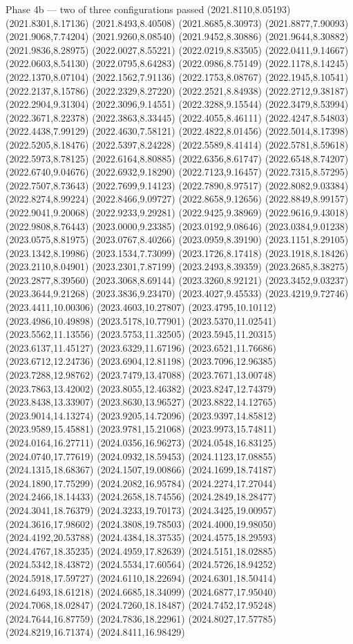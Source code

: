 \documentclass[aspectratio=169,10pt]{beamer}
\begin{document}
\begin{frame}[t]{Phase 4b — two of three configurations passed}
(2021.8110,8.05193) (2021.8301,8.17136) (2021.8493,8.40508) (2021.8685,8.30973) (2021.8877,7.90093) (2021.9068,7.74204) (2021.9260,8.08540) (2021.9452,8.30886) (2021.9644,8.30882) (2021.9836,8.28975) (2022.0027,8.55221) (2022.0219,8.83505) (2022.0411,9.14667) (2022.0603,8.54130) (2022.0795,8.64283) (2022.0986,8.75149) (2022.1178,8.14245) (2022.1370,8.07104) (2022.1562,7.91136) (2022.1753,8.08767) (2022.1945,8.10541) (2022.2137,8.15786) (2022.2329,8.27220) (2022.2521,8.84938) (2022.2712,9.38187) (2022.2904,9.31304) (2022.3096,9.14551) (2022.3288,9.15544) (2022.3479,8.53994) (2022.3671,8.22378) (2022.3863,8.33445) (2022.4055,8.46111) (2022.4247,8.54803) (2022.4438,7.99129) (2022.4630,7.58121) (2022.4822,8.01456) (2022.5014,8.17398) (2022.5205,8.18476) (2022.5397,8.24228) (2022.5589,8.41414) (2022.5781,8.59618) (2022.5973,8.78125) (2022.6164,8.80885) (2022.6356,8.61747) (2022.6548,8.74207) (2022.6740,9.04676) (2022.6932,9.18290) (2022.7123,9.16457) (2022.7315,8.57295) (2022.7507,8.73643) (2022.7699,9.14123) (2022.7890,8.97517) (2022.8082,9.03384) (2022.8274,8.99224) (2022.8466,9.09727) (2022.8658,9.12656) (2022.8849,8.99157) (2022.9041,9.20068) (2022.9233,9.29281) (2022.9425,9.38969) (2022.9616,9.43018) (2022.9808,8.76443) (2023.0000,9.23385) (2023.0192,9.08646) (2023.0384,9.01238) (2023.0575,8.81975) (2023.0767,8.40266) (2023.0959,8.39190) (2023.1151,8.29105) (2023.1342,8.19986) (2023.1534,7.73099) (2023.1726,8.17418) (2023.1918,8.18426) (2023.2110,8.04901) (2023.2301,7.87199) (2023.2493,8.39359) (2023.2685,8.38275) (2023.2877,8.39560) (2023.3068,8.69144) (2023.3260,8.92121) (2023.3452,9.03237) (2023.3644,9.21268) (2023.3836,9.23470) (2023.4027,9.45533) (2023.4219,9.72746) (2023.4411,10.00306) (2023.4603,10.27807) (2023.4795,10.10112) (2023.4986,10.49898) (2023.5178,10.77901) (2023.5370,11.02541) (2023.5562,11.13556) (2023.5753,11.32505) (2023.5945,11.20315) (2023.6137,11.45127) (2023.6329,11.67196) (2023.6521,11.76686) (2023.6712,12.24736) (2023.6904,12.81198) (2023.7096,12.96385) (2023.7288,12.98762) (2023.7479,13.47088) (2023.7671,13.00748) (2023.7863,13.42002) (2023.8055,12.46382) (2023.8247,12.74379) (2023.8438,13.33907) (2023.8630,13.96527) (2023.8822,14.12765) (2023.9014,14.13274) (2023.9205,14.72096) (2023.9397,14.85812) (2023.9589,15.45881) (2023.9781,15.21068) (2023.9973,15.74811) (2024.0164,16.27711) (2024.0356,16.96273) (2024.0548,16.83125) (2024.0740,17.77619) (2024.0932,18.59453) (2024.1123,17.08855) (2024.1315,18.68367) (2024.1507,19.00866) (2024.1699,18.74187) (2024.1890,17.75299) (2024.2082,16.95784) (2024.2274,17.27044) (2024.2466,18.14433) (2024.2658,18.74556) (2024.2849,18.28477) (2024.3041,18.76379) (2024.3233,19.70173) (2024.3425,19.00957) (2024.3616,17.98602) (2024.3808,19.78503) (2024.4000,19.98050) (2024.4192,20.53788) (2024.4384,18.37535) (2024.4575,18.29593) (2024.4767,18.35235) (2024.4959,17.82639) (2024.5151,18.02885) (2024.5342,18.43872) (2024.5534,17.60564) (2024.5726,18.94252) (2024.5918,17.59727) (2024.6110,18.22694) (2024.6301,18.50414) (2024.6493,18.61218) (2024.6685,18.34099) (2024.6877,17.95040) (2024.7068,18.02847) (2024.7260,18.18487) (2024.7452,17.95248) (2024.7644,16.87759) (2024.7836,18.22961) (2024.8027,17.57785) (2024.8219,16.71374) (2024.8411,16.98429) 
\end{frame}
\end{document}
